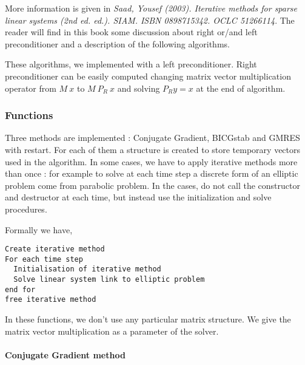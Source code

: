 More information is given in {\em Saad, Yousef (2003). Iterative methods for
  sparse linear systems (2nd ed. ed.). SIAM. ISBN 0898715342. OCLC 51266114}.
The reader will find in this book some discussion about right or/and left
preconditioner and a description of the following algorithms.

These algorithms, we implemented with a left preconditioner. Right preconditioner
can be easily computed changing matrix vector multiplication operator from $M \
x $ to $ M \ P_R \ x$ and solving $P_R y = x$ at the end of algorithm.


\subsubsection{Functions}

Three methods are implemented : Conjugate Gradient, BICGstab and GMRES with
restart. For each of them a structure is created to store temporary vectors
used in the algorithm. In some cases, we have to apply iterative methods more
than once : for example to solve at each time step a discrete form of an
elliptic problem come from parabolic problem. In the cases, do not call the constructor and
destructor at each time, but instead use the initialization and solve procedures.

Formally we have, 
\begin{verbatim}
Create iterative method
For each time step
  Initialisation of iterative method
  Solve linear system link to elliptic problem
end for
free iterative method
\end{verbatim}

In these functions, we don't use any particular matrix structure. We give the
matrix vector multiplication as a parameter of the solver. 

\paragraph{Conjugate Gradient method}


